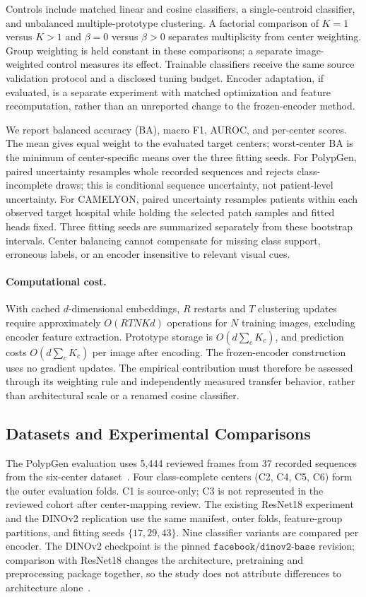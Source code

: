 Controls include matched linear and cosine classifiers, a single-centroid classifier, and unbalanced multiple-prototype clustering. A factorial comparison of $K=1$ versus $K>1$ and $\beta=0$ versus $\beta>0$ separates multiplicity from center weighting. Group weighting is held constant in these comparisons; a separate image-weighted control measures its effect. Trainable classifiers receive the same source validation protocol and a disclosed tuning budget. Encoder adaptation, if evaluated, is a separate experiment with matched optimization and feature recomputation, rather than an unreported change to the frozen-encoder method.

We report balanced accuracy (BA), macro F1, AUROC, and per-center scores. The mean gives equal weight to the evaluated target centers; worst-center BA is the minimum of center-specific means over the three fitting seeds. For PolypGen, paired uncertainty resamples whole recorded sequences and rejects class-incomplete draws; this is conditional sequence uncertainty, not patient-level uncertainty. For CAMELYON, paired uncertainty resamples patients within each observed target hospital while holding the selected patch samples and fitted heads fixed. Three fitting seeds are summarized separately from these bootstrap intervals. Center balancing cannot compensate for missing class support, erroneous labels, or an encoder insensitive to relevant visual cues.

\paragraph{Computational cost.}
With cached $d$-dimensional embeddings, $R$ restarts and $T$ clustering updates require approximately $O(RTNKd)$ operations for $N$ training images, excluding encoder feature extraction. Prototype storage is $O(d\sum_c K_c)$, and prediction costs $O(d\sum_c K_c)$ per image after encoding. The frozen-encoder construction uses no gradient updates. The empirical contribution must therefore be assessed through its weighting rule and independently measured transfer behavior, rather than architectural scale or a renamed cosine classifier.

\subsection{Datasets and Experimental Comparisons}
The PolypGen evaluation uses 5,444 reviewed frames from 37 recorded sequences from the six-center dataset~\cite{ali2023polypgen}. Four class-complete centers (C2, C4, C5, C6) form the outer evaluation folds. C1 is source-only; C3 is not represented in the reviewed cohort after center-mapping review. The existing ResNet18 experiment and the DINOv2 replication use the same manifest, outer folds, feature-group partitions, and fitting seeds $\{17,29,43\}$. Nine classifier variants are compared per encoder. The DINOv2 checkpoint is the pinned $\texttt{facebook/dinov2-base}$ revision; comparison with ResNet18 changes the architecture, pretraining and preprocessing package together, so the study does not attribute differences to architecture alone~\cite{he2016deep,oquab2024dinov2}.

